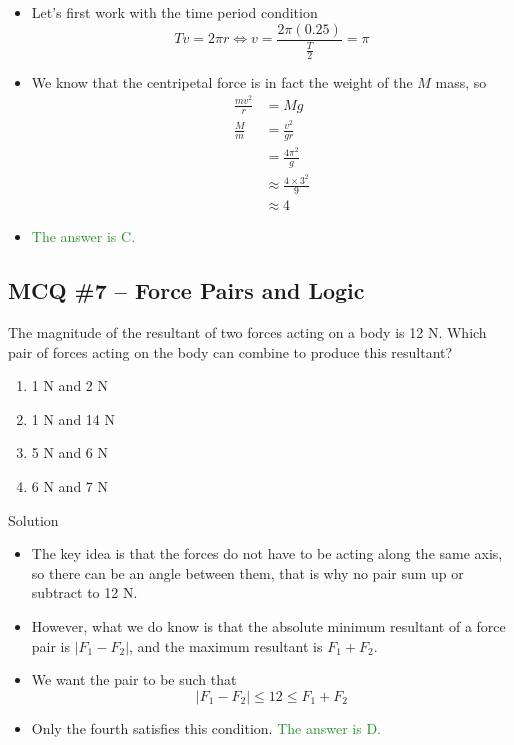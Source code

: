 \documentclass[a4paper,12pt]{article}
\newcommand{\ans}[1]{\textcolor{ForestGreen}{The answer is #1.}}
\begin{document}
\begin{itemize}
  \item Let's first work with the time period condition
        $$Tv = 2\pi r \iff v = \frac{2\pi (0.25)}{\frac{T}{2}} = \pi$$
  \item We know that the centripetal force is in fact the weight of the $M$ mass, so
        \begin{align*}
          \frac{mv^2}{r} & = Mg                          \\
          \frac{M}{m}    & = \frac{v^2}{g r}             \\
                         & = \frac{4\pi^2}{g}            \\
                         & \approx \frac{4\times 3^2}{9} \\
                         & \approx 4
        \end{align*}
  \item \ans{C}
\end{itemize}

\subsection{MCQ \#7 -- Force Pairs and Logic}

The magnitude of the resultant of two forces acting on a body is 12 N. Which pair of forces acting on the body can combine to produce this resultant?
\begin{enumerate}[label=\Alph*.]
  \item 1 N and 2 N
  \item 1 N and 14 N
  \item 5 N and 6 N
  \item 6 N and 7 N
\end{enumerate}
Solution
\begin{itemize}
  \item The key idea is that the forces do not have to be acting along the same axis, so there can be an angle between them, that is why no pair sum up or subtract to 12 N.
  \item However, what we do know is that the absolute minimum resultant of a force pair is $|F_1 - F_2|$, and the maximum resultant is $F_1 + F_2$.
  \item We want the pair to be such that
        $$|F_1 - F_2| \le 12 \le F_1 + F_2$$
  \item Only the fourth satisfies this condition. \ans{D}
\end{itemize}
\end{document}
